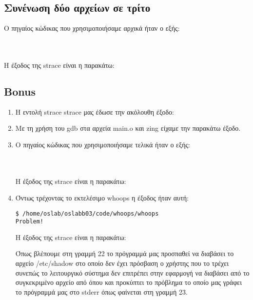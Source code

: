 \documentclass[a4paper,10pt]{article} \usepackage{anysize}
\begin{document}
\pagebreak

\subsection{Συνένωση δύο αρχείων σε τρίτο}

Ο πηγαίος κώδικας που χρησιμοποιήσαμε αρχικά ήταν ο εξής:
\inputminted[linenos,fontsize=\footnotesize]{c}{../stage_1/fconc.h}

\inputminted[linenos,fontsize=\footnotesize]{c}{../stage_1/fconc.c}

\inputminted[linenos,fontsize=\footnotesize]{basemake}{../stage_1/makefile}


Η έξοδος της strace είναι η παρακάτω:


\subsection{Bonus}

\begin{enumerate}
\item Η εντολή strace strace μας έδωσε την ακόλουθη έξοδο:

\item Με τη χρήση του gdb στα αρχεία main.o και zing είχαμε την παρακάτω έξοδο.


\item Ο πηγαίος κώδικας που χρησιμοποιήσαμε τελικά ήταν ο εξής:
\inputminted[linenos,fontsize=\footnotesize]{c}{../stage_2/fconc.h}
\inputminted[linenos,fontsize=\footnotesize]{c}{../stage_2/fconc.c}
\inputminted[linenos,fontsize=\footnotesize]{basemake}{../stage_2/makefile}
Η έξοδος της strace είναι η παρακάτω:

\item Όντως τρέχοντας το εκτελέσιμο whoops η έξοδος ήταν αυτή:

\begin{verbatim}
$ /home/oslab/oslabb03/code/whoops/whoops
Problem!
\end{verbatim}
Η έξοδος της strace είναι η παρακάτω:

Όπως βλέπουμε στη γραμμή 22 το πρόγραμμά μας προσπαθεί να διαβάσει το αρχείο
/etc/shadow στο οποίο δεν έχει πρόσβαση ο χρήστης που το τρέχει συνεπώς το
λειτουργικό σύστημα δεν επιτρέπει στην εφαρμογή να διαβάσει από το
συγκεκριμένο αρχείο από όπου και προκύπτει το πρόβλημα το οποίο μας γράφει το
πρόγραμμά μας στο stderr όπως φαίνεται στη γραμμή 23.
\end{enumerate}
\end{document}
